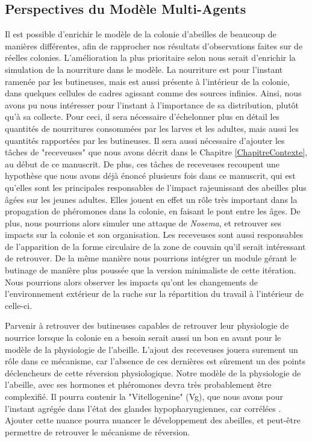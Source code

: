 	\subsection{Perspectives du Modèle Multi-Agents}
	Il est possible d'enrichir le modèle de la colonie d'abeilles de beaucoup de manières différentes, afin de rapprocher nos résultats d'observations faites sur de réelles colonies. L'amélioration la plus prioritaire selon nous serait d'enrichir la simulation de la nourriture dans le modèle. La nourriture est pour l'instant ramenée par les butineuses, mais est aussi présente à l'intérieur de la colonie, dans quelques cellules de cadres agissant comme des sources infinies. Ainsi, nous avons pu nous intéresser pour l'instant à l'importance de sa distribution, plutôt qu'à sa collecte. Pour ceci, il sera nécessaire d'échelonner plus en détail les quantités de nourritures consommées par les larves et les adultes, mais aussi les quantités rapportées par les butineuses. Il sera aussi nécessaire d'ajouter les tâches de "receveuses" que nous avons décrit dans le Chapitre \ref{ChapitreContexte}, au début de ce manuscrit. De plus, ces tâches de receveuses recoupent une hypothèse que nous avons déjà énoncé plusieurs fois dans ce manuscrit, qui est qu'elles sont les principales responsables de l'impact rajeunissant des abeilles plus âgées sur les jeunes adultes. Elles jouent en effet un rôle très important dans la propagation de phéromones dans la colonie, en faisant le pont entre les âges. De plus, nous pourrions alors simuler une attaque de \textit{Nosema}, et retrouver ses impacts sur la colonie et son organisation. Les receveuses sont aussi responsables de l'apparition de la forme circulaire de la zone de couvain \cite{camazine_self-organizing_1991} qu'il serait intéressant de retrouver. De la même manière nous pourrions intégrer un module gérant le butinage de manière plus poussée que la version minimaliste de cette itération. Nous pourrions alors observer les impacts qu'ont les changements de l'environnement extérieur de la ruche sur la répartition du travail à l'intérieur de celle-ci.
	
	Parvenir à retrouver des butineuses capables de retrouver leur physiologie de nourrice lorsque la colonie en a besoin serait aussi un bon en avant pour le modèle de la physiologie de l'abeille. L'ajout des receveuses jouera surement un rôle dans ce mécanisme, car l'absence de ces dernières est sûrement un des points déclencheurs de cette réversion physiologique. Notre modèle de la physiologie de l'abeille, avec ses hormones et phéromones devra très probablement être complexifié. Il pourra contenir la "Vitellogenine" (Vg), que nous avons pour l'instant agrégée dans l'état des glandes hypopharyngiennes, car corrélées \cite{johnson_division_2010}. Ajouter cette nuance pourra nuancer le développement des abeilles, et peut-être permettre de retrouver le mécanisme de réversion.
	
